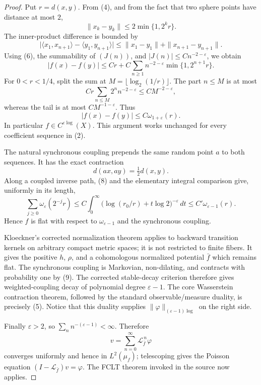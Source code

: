\documentclass[11pt]{article}
\newcommand{\cL}{\mathscr L}
\begin{document}
\begin{proof}
Put \(r=d(x,y)\).  From (4), and from the fact that two sphere points have
distance at most \(2\),
\[
 \|x_k-y_k\|\le 2\min\{1,2^k r\}.
 \tag{6}
\]
The inner-product difference is bounded by
\[
 \big|\langle x_1,x_{n+1}\rangle-
          \langle y_1,y_{n+1}\rangle\big|
 \le \|x_1-y_1\|+\|x_{n+1}-y_{n+1}\|.
\]
Using (6), the summability of \((J(n))\), and
\(|J(n)|\le Cn^{-2-\varepsilon}\), we obtain
\[
 |f(x)-f(y)|
 \le C r+C\sum_{n\ge1}n^{-2-\varepsilon}
                  \min\{1,2^{n+1}r\}.
 \tag{7}
\]
For \(0<r<1/4\), split the sum at
\(M=\lfloor\log_2(1/r)\rfloor\).  The part \(n\le M\) is at most
\[
 Cr\sum_{n\le M}2^n n^{-2-\varepsilon}
 \le C M^{-2-\varepsilon},
\]
whereas the tail is at most \(CM^{-1-\varepsilon}\).  Thus
\[
 |f(x)-f(y)|\le C\omega_{1+\varepsilon}(r).
 \tag{8}
\]
In particular \(f\in C^{\varepsilon\log}(X)\).  This argument works unchanged
for every coefficient sequence in (2).

The natural synchronous coupling prepends the same random point \(a\) to both
sequences.  It has the exact contraction
\[
 d(ax,ay)=\tfrac12d(x,y).
 \tag{9}
\]
Along a coupled inverse path, (8) and the elementary integral comparison give,
uniformly in its length,
\[
 \sum_{j\ge0}\omega_\varepsilon(2^{-j}r)
 \le C\int_0^\infty
       \bigl(\log(r_0/r)+t\log2\bigr)^{-\varepsilon}\,dt
 \le C'\omega_{\varepsilon-1}(r).
 \tag{10}
\]
Hence \(f\) is flat with respect to \(\omega_{\varepsilon-1}\) and the
synchronous coupling.

Kloeckner's corrected normalization theorem applies to backward transition
kernels on arbitrary compact metric spaces; it is not restricted to finite
fibers.  It gives the positive \(h\), \(\rho\), and a cohomologous normalized
potential \(\bar f\) which remains flat.  The synchronous coupling is Markovian,
non-dilating, and contracts with probability one by (9).  The corrected
stable-decay criterion therefore gives weighted-coupling decay of polynomial
degree \(\varepsilon-1\).  The core Wasserstein contraction theorem, followed by
the standard observable/measure duality, is precisely (5).  Notice that this
duality supplies \(\|\varphi\|_{(\varepsilon-1)\log}\) on the right side.

Finally \(\varepsilon>2\), so
\(\sum_n n^{-(\varepsilon-1)}<\infty\).  Therefore
\[
 v=\sum_{n=0}^{\infty}\cL_{\bar f}^{\,n}\varphi
\]
converges uniformly and hence in \(L^2(\mu_f)\); telescoping gives the Poisson
equation \((I-\cL_{\bar f})v=\varphi\).  The FCLT theorem invoked in the source
now applies.
\end{proof}
\end{document}
